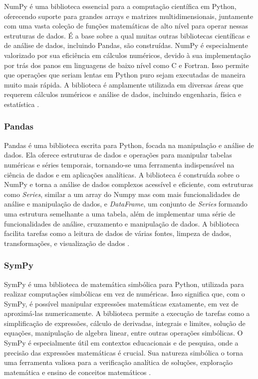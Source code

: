 NumPy é uma biblioteca essencial para a computação científica em Python, oferecendo suporte para grandes arrays e
matrizes multidimensionais, juntamente com uma vasta coleção de funções matemáticas de alto nível para operar nessas
estruturas de dados.
É a base sobre a qual muitas outras bibliotecas científicas e de análise de dados, incluindo Pandas, são construídas.
NumPy é especialmente valorizado por sua eficiência em cálculos numéricos, devido à sua implementação por trás dos panos
em linguagens de baixo nível como C e Fortran.
Isso permite que operações que seriam lentas em Python puro sejam executadas de maneira muito mais rápida.
A biblioteca é amplamente utilizada em diversas áreas que requerem cálculos numéricos e análise de dados, incluindo
engenharia, física e estatística \cite{numpy}.

\subsubsection{Pandas}

Pandas é uma biblioteca escrita para Python, focada na manipulação e análise de dados.
Ela oferece estruturas de dados e operações para manipular tabelas numéricas e séries temporais, tornando-se uma
ferramenta indispensável na ciência de dados e em aplicações analíticas.
A biblioteca é construída sobre o NumPy e torna a análise de dados complexos acessível e eficiente, com estruturas como
\textit{Series}, similar a um array do Numpy mas com mais funcionalidades de análise e manipulação de dados, e
\textit{DataFrame}, um conjunto de \textit{Series} formando uma estrutura semelhante a uma tabela, além de implementar
uma série de funcionalidades de análise, cruzamento e manipulação de dados.
A biblioteca facilita tarefas como a leitura de dados de várias fontes, limpeza de dados, transformações, e visualização
de dados \cite{pandas}.

\subsubsection{SymPy}

SymPy é uma biblioteca de matemática simbólica para Python, utilizada para realizar computações simbólicas em vez de
numéricas.
Isso significa que, com o SymPy, é possível manipular expressões matemáticas exatamente, em vez de aproximá-las
numericamente.
A biblioteca permite a execução de tarefas como a simplificação de expressões, cálculo de derivadas, integrais e
limites, solução de equações, manipulação de algebra linear, entre outras operações simbólicas.
O SymPy é especialmente útil em contextos educacionais e de pesquisa, onde a precisão das expressões matemáticas é
crucial.
Sua natureza simbólica o torna uma ferramenta valiosa para a verificação analítica de soluções, exploração matemática e
ensino de conceitos matemáticos \cite{sympy}.

